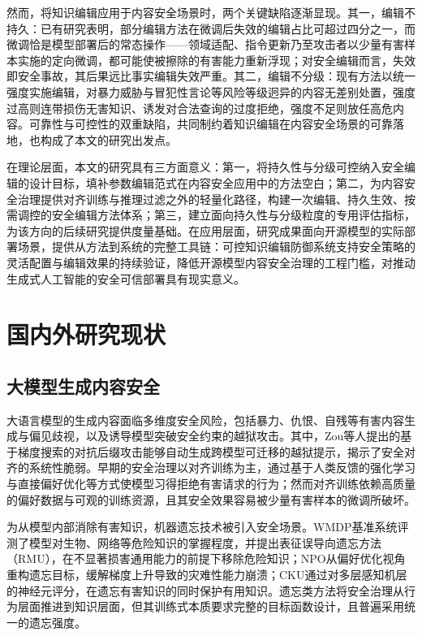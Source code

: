 然而，将知识编辑应用于内容安全场景时，两个关键缺陷逐渐显现。其一，编辑不持久：已有研究表明，部分编辑方法在微调后失效的编辑占比可超过四分之一\cite{cheng2025finetune}，而微调恰是模型部署后的常态操作——领域适配、指令更新乃至攻击者以少量有害样本实施的定向微调，都可能使被擦除的有害能力重新浮现\cite{qi2023finetuning}；对安全编辑而言，失效即安全事故，其后果远比事实编辑失效严重。其二，编辑不分级：现有方法以统一强度实施编辑，对暴力威胁与冒犯性言论等风险等级迥异的内容无差别处置，强度过高则连带损伤无害知识、诱发对合法查询的过度拒绝，强度不足则放任高危内容\cite{shi2025cku,lu2025toxedit}。可靠性与可控性的双重缺陷，共同制约着知识编辑在内容安全场景的可靠落地，也构成了本文的研究出发点。

在理论层面，本文的研究具有三方面意义：第一，将持久性与分级可控纳入安全编辑的设计目标，填补参数编辑范式在内容安全应用中的方法空白；第二，为内容安全治理提供对齐训练与推理过滤之外的轻量化路径，构建一次编辑、持久生效、按需调控的安全编辑方法体系；第三，建立面向持久性与分级粒度的专用评估指标，为该方向的后续研究提供度量基础。在应用层面，研究成果面向开源模型的实际部署场景，提供从方法到系统的完整工具链：可控知识编辑防御系统支持安全策略的灵活配置与编辑效果的持续验证，降低开源模型内容安全治理的工程门槛，对推动生成式人工智能的安全可信部署具有现实意义。

\section{国内外研究现状}

\subsection{大模型生成内容安全}

大语言模型的生成内容面临多维度安全风险，包括暴力、仇恨、自残等有害内容生成与偏见歧视，以及诱导模型突破安全约束的越狱攻击。其中，Zou等人\cite{zou2023gcg}提出的基于梯度搜索的对抗后缀攻击能够自动生成跨模型可迁移的越狱提示，揭示了安全对齐的系统性脆弱。早期的安全治理以对齐训练为主，通过基于人类反馈的强化学习\cite{ouyang2022instruct}与直接偏好优化\cite{rafailov2023dpo}等方式使模型习得拒绝有害请求的行为；然而对齐训练依赖高质量的偏好数据与可观的训练资源，且其安全效果容易被少量有害样本的微调所破坏\cite{qi2023finetuning}。

为从模型内部消除有害知识，机器遗忘技术被引入安全场景。WMDP基准\cite{li2024wmdp}系统评测了模型对生物、网络等危险知识的掌握程度，并提出表征误导向遗忘方法（RMU），在不显著损害通用能力的前提下移除危险知识；NPO\cite{zhang2024npo}从偏好优化视角重构遗忘目标，缓解梯度上升导致的灾难性能力崩溃；CKU\cite{shi2025cku}通过对多层感知机层的神经元评分，在遗忘有害知识的同时保护有用知识。遗忘类方法将安全治理从行为层面推进到知识层面，但其训练式本质要求完整的目标函数设计，且普遍采用统一的遗忘强度。

